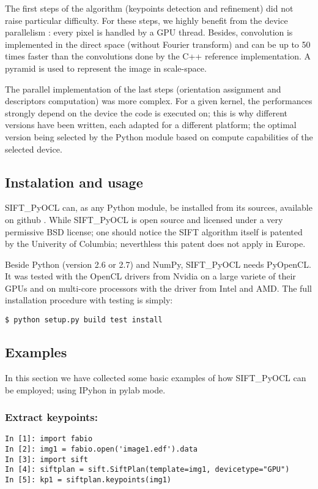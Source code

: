 \documentclass[preprint]{iucr}
\begin{document}
The first steps of the algorithm (keypoints detection and refinement) did not 
raise particular difficulty. 
For these steps, we highly benefit from the device parallelism : every pixel 
is handled by a GPU thread. 
Besides, convolution is implemented in the direct space (without Fourier
transform) and can be up to 50 times faster than the convolutions done by the
C++ reference implementation. 
A pyramid is used to represent the image in scale-space\cite{Lowe04}.

The parallel implementation of the last steps (orientation assignment and 
descriptors computation) was more complex. 
For a given kernel, the performances strongly depend on the device 
the code is executed on; this is why different versions have been written, each 
adapted for a different platform; the optimal version being selected by the
Python module based on compute capabilities of the selected device.  


\subsection{Instalation and usage}
SIFT\_PyOCL can, as any Python module, be installed from its sources,
available on github \cite{sift_pyocl}.
While SIFT\_PyOCL is open source and licensed under a very
permissive BSD license; one should notice the SIFT algorithm itself is
patented by the Univerity of Columbia\cite{SIFT_pat}; neverthless this patent does
not apply in Europe.

Beside Python (version 2.6 or 2.7) and NumPy, SIFT\_PyOCL needs
PyOpenCL\cite{pyopencl}.
It was tested with the OpenCL drivers from Nvidia on a
large variete of their GPUs and on multi-core processors with the driver from
Intel and AMD. The full installation procedure with testing is simply:
\begin{verbatim}
$ python setup.py build test install
\end{verbatim}


\subsection{Examples}

In this section we have collected some basic examples of how
SIFT\_PyOCL can be employed; using IPyhon\cite{ipython} in
pylab\cite{matplotlib} mode.

\subsubsection{Extract keypoints:}
\begin{verbatim}
In [1]: import fabio 
In [2]: img1 = fabio.open('image1.edf').data
In [3]: import sift
In [4]: siftplan = sift.SiftPlan(template=img1, devicetype="GPU")
In [5]: kp1 = siftplan.keypoints(img1)
\end{verbatim}
\end{document}
